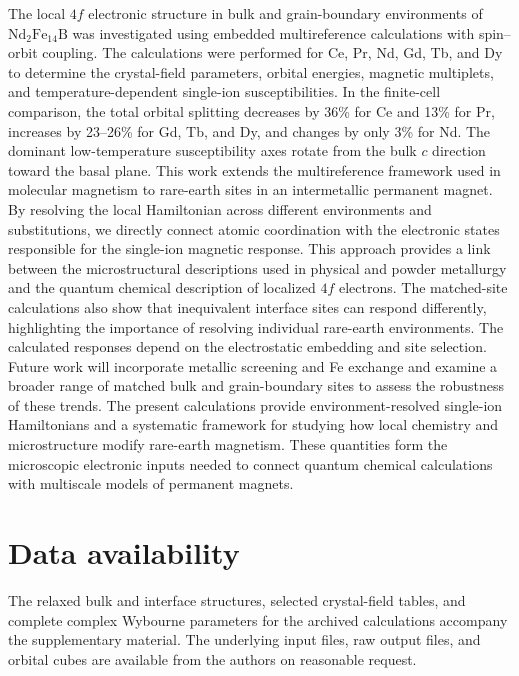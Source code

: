 \documentclass[final,1p,times]{elsarticle}
\DeclareRobustCommand{\rev}[1]{{\color{revcolor}#1}}
\newcommand{\ndfeb}{\mathrm{Nd_2Fe_{14}B}}
\begin{document}
\rev{The local $4f$ electronic structure in bulk and grain-boundary environments of $\ndfeb$ was investigated using embedded multireference calculations with spin--orbit coupling. The calculations were performed for Ce, Pr, Nd, Gd, Tb, and Dy to determine the crystal-field parameters, orbital energies, magnetic multiplets, and temperature-dependent single-ion susceptibilities. In the finite-cell comparison, the total orbital splitting decreases by 36\% for Ce and 13\% for Pr, increases by 23--26\% for Gd, Tb, and Dy, and changes by only 3\% for Nd. The dominant low-temperature susceptibility axes rotate from the bulk $c$ direction toward the basal plane.} \rev{This work extends the multireference framework used in molecular magnetism to rare-earth sites in an intermetallic permanent magnet. By resolving the local Hamiltonian across different environments and substitutions, we directly connect atomic coordination with the electronic states responsible for the single-ion magnetic response. This approach provides a link between the microstructural descriptions used in physical and powder metallurgy and the quantum chemical description of localized $4f$ electrons. The matched-site calculations also show that inequivalent interface sites can respond differently, highlighting the importance of resolving individual rare-earth environments.} \rev{The calculated responses depend on the electrostatic embedding and site selection. Future work will incorporate metallic screening and Fe exchange and examine a broader range of matched bulk and grain-boundary sites to assess the robustness of these trends. The present calculations provide environment-resolved single-ion Hamiltonians and a systematic framework for studying how local chemistry and microstructure modify rare-earth magnetism. These quantities form the microscopic electronic inputs needed to connect quantum chemical calculations with multiscale models of permanent magnets.}

\section*{Data availability}
\rev{The relaxed bulk and interface structures, selected crystal-field tables, and complete complex Wybourne parameters for the archived calculations accompany the supplementary material.} \rev{The underlying input files, raw output files, and orbital cubes are available from the authors on reasonable request.}
\end{document}
